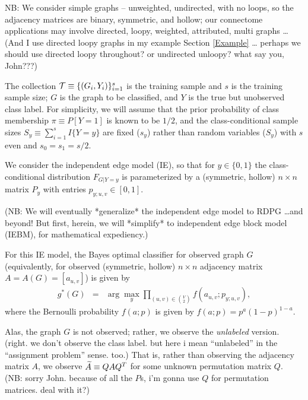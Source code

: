 NB:
We consider simple graphs -- unweighted, undirected, with no loops,
so the adjacency matrices are binary, symmetric, and hollow;
our connectome applications
may involve {directed, loopy, weighted, attributed, multi} graphs \ldots
(And I use directed loopy graphs in my example Section \ref{Example} \dots
perhaps we should use directed loopy throughout? or undirected unloopy? what say you, John???)

The collection
$\mathcal{T} \equiv \{(G_i,Y_i)\}_{i=1}^s$ is the training sample
and $s$ is the training sample size;
$G$ is the graph to be classified,
and $Y$ is the true but unobserved class label.
For simplicity, we will assume that the prior probability of class membership
$\pi \equiv P[Y=1]$ is known to be $1/2$,
and the class-conditional sample sizes $S_y \equiv \sum_{i=1}^s I\{Y=y\}$
are fixed ($s_y$) rather than random variables ($S_y$)
with $s$ even and $s_0=s_1=s/2$.

We consider the independent edge model (IE),
so that for $y \in \{0,1\}$ the class-conditional distribution $F_{G|Y=y}$
is parameterized by a (symmetric, hollow)
$n \times n$ matrix $P_y$ with entries $p_{y;u,v} \in [0,1]$.

(NB: We will eventually *generalize* the independent edge model to RDPG \ldots and beyond!
But first, herein, we will *simplify* to independent edge block model (IEBM), for mathematical expediency.)

For this IE model, the Bayes optimal classifier for observed graph $G$
(equivalently, for observed (symmetric, hollow) $n \times n$ adjacency matrix $A=A(G)=[a_{u,v}]$)
is given by
\begin{eqnarray}
g^*(G) &=& \arg\max_y \prod_{(u,v) \in {V \choose 2}} f(a_{u,v};p_{y;u,v}),
\end{eqnarray}
where the Bernoulli probability $f(a;p)$ is given by
$f(a;p) = p^{a} (1-p)^{1-a}$.

Alas, the graph $G$ is not observed;
rather, we observe the {\em unlabeled} version.
(right. we don't observe the class label.
but here i mean ``unlabeled'' in the ``assignment problem'' sense.
too.)
That is, rather than observing the adjacency matrix $A$,
we observe $\widetilde{A} \equiv QAQ^T$ for some unknown permutation matrix $Q$.
\\
(NB: sorry John.  because of all the $P$s, i'm gonna use $Q$ for permutation matrices.  deal with it?)




